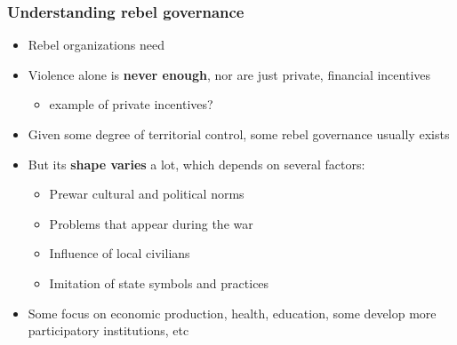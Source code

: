 \documentclass[aspectratio=43]{beamer}
\begin{document}
\begin{frame}
\frametitle{Understanding rebel governance}
\centering

\begin{itemize}[<+->]
  \item Rebel organizations need 
  \item Violence alone is \textbf{never enough}, nor are just private, financial incentives
  \begin{itemize}
    \item example of private incentives?
  \end{itemize}
  \item Given some degree of territorial control, some rebel governance usually exists
  \item But its \textbf{shape varies} a lot, which depends on several factors:
  \begin{itemize}
    \item Prewar cultural and political norms
    \item Problems that appear during the war
    \item Influence of local civilians
    \item Imitation of state symbols and practices
  \end{itemize}
  \item Some focus on economic production, health, education, some develop more participatory institutions, etc
\end{itemize}

\end{frame}
\end{document}
